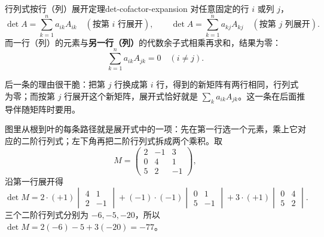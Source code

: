 \begin{conclusion}{行列式按行（列）展开定理}{det-cofactor-expansion}
对任意固定的行 $i$ 或列 $j$，
\[
\det A=\sum_{k=1}^{n}a_{ik}A_{ik}\quad(\text{按第 }i\text{ 行展开}),
\qquad
\det A=\sum_{k=1}^{n}a_{kj}A_{kj}\quad(\text{按第 }j\text{ 列展开}).
\]
而一行（列）的元素与\textbf{另一行（列）}的代数余子式相乘再求和，结果为零：
\[
\sum_{k=1}^{n}a_{ik}A_{jk}=0\quad(i\neq j).
\]
\end{conclusion}

后一条的理由很干脆：把第 $j$ 行换成第 $i$ 行，得到的新矩阵有两行相同，行列式为零；而按第 $j$ 行展开这个新矩阵，展开式恰好就是 $\sum_k a_{ik}A_{jk}$。这一条在后面推导伴随矩阵时要用。

\begin{center}
\end{center}

图里从根到叶的每条路径就是展开式中的一项：先在第一行选一个元素，乘上它对应的二阶行列式；左下角再把二阶行列式拆成两个乘积。取
\[
M=\begin{pmatrix}2&-1&3\\0&4&1\\5&2&-1\end{pmatrix},
\]
沿第一行展开得
\[
\det M=2\cdot(+1)\begin{vmatrix}4&1\\2&-1\end{vmatrix}
+(-1)\cdot(-1)\begin{vmatrix}0&1\\5&-1\end{vmatrix}
+3\cdot(+1)\begin{vmatrix}0&4\\5&2\end{vmatrix}.
\]
三个二阶行列式分别为 $-6,-5,-20$，所以 $\det M=2(-6)-5+3(-20)=-77$。

